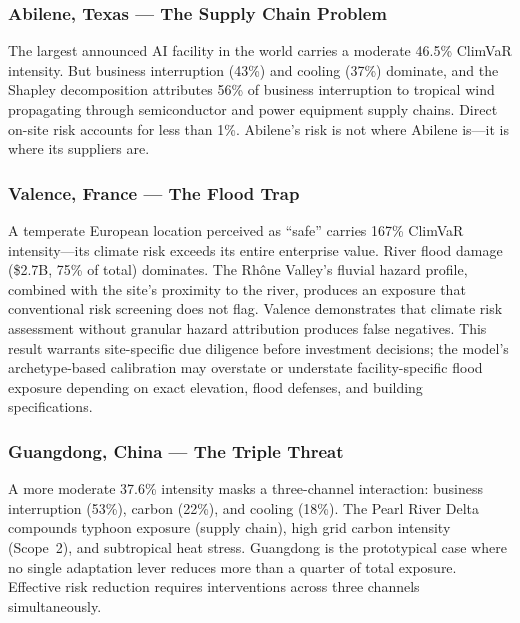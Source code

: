 
\begin{twocolbody}

\subsubsection*{Abilene, Texas --- The Supply Chain Problem}

The largest announced AI facility in the world carries a moderate 46.5\% ClimVaR intensity. But business interruption (43\%) and cooling (37\%) dominate, and the Shapley decomposition attributes 56\% of business interruption to tropical wind propagating through semiconductor and power equipment supply chains. Direct on-site risk accounts for less than 1\%. Abilene's risk is not where Abilene is---it is where its suppliers are.

\subsubsection*{Valence, France --- The Flood Trap}

A temperate European location perceived as ``safe'' carries 167\% ClimVaR intensity---its climate risk exceeds its entire enterprise value. River flood damage (\$2.7B, 75\% of total) dominates. The Rh\^{o}ne Valley's fluvial hazard profile, combined with the site's proximity to the river, produces an exposure that conventional risk screening does not flag. Valence demonstrates that climate risk assessment without granular hazard attribution produces false negatives. This result warrants site-specific due diligence before investment decisions; the model's archetype-based calibration may overstate or understate facility-specific flood exposure depending on exact elevation, flood defenses, and building specifications.

\subsubsection*{Guangdong, China --- The Triple Threat}

A more moderate 37.6\% intensity masks a three-channel interaction: business interruption (53\%), carbon (22\%), and cooling (18\%). The Pearl River Delta compounds typhoon exposure (supply chain), high grid carbon intensity (Scope~2), and subtropical heat stress. Guangdong is the prototypical case where no single adaptation lever reduces more than a quarter of total exposure. Effective risk reduction requires interventions across three channels simultaneously.

\end{twocolbody}


